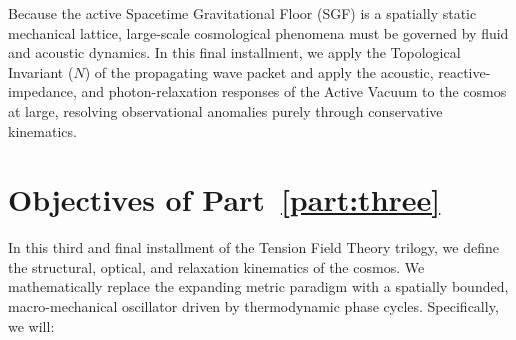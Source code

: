 Because the active Spacetime Gravitational Floor (SGF) is a spatially static mechanical lattice, large-scale cosmological phenomena must be governed by fluid and acoustic dynamics. In this final installment, we apply the Topological Invariant ($N$) of the propagating wave packet and apply the acoustic, reactive-impedance, and photon-relaxation responses of the Active Vacuum to the cosmos at large, resolving observational anomalies purely through conservative kinematics.

\section{Objectives of Part~\ref{part:three}}

In this third and final installment of the Tension Field Theory trilogy, we define the structural, optical, and relaxation kinematics of the cosmos. We mathematically replace the expanding metric paradigm with a spatially bounded, macro-mechanical oscillator driven by thermodynamic phase cycles. Specifically, we will:

